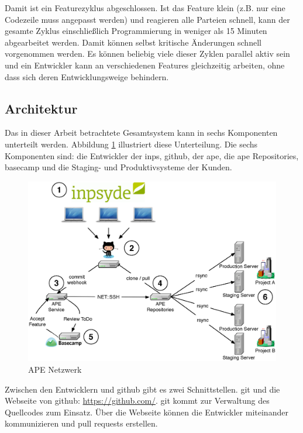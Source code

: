 Damit ist ein Featurezyklus abgeschlossen. Ist das Feature klein (z.B. nur eine Codezeile muss angepasst werden) und reagieren alle Parteien schnell, kann der gesamte Zyklus einschließlich Programmierung in weniger als 15 Minuten abgearbeitet werden. Damit können selbst kritische Änderungen schnell vorgenommen werden. Es können beliebig viele dieser Zyklen parallel aktiv sein und ein Entwickler kann an verschiedenen Features gleichzeitig arbeiten, ohne dass sich deren Entwicklungsweige behindern.


\subsection{Architektur} %
\label{sub:architektur}

Das in dieser Arbeit betrachtete Gesamtsystem kann in sechs Komponenten unterteilt werden. Abbildung \ref{fig:ape_network} illustriert diese Unterteilung. Die sechs Komponenten sind:  die Entwickler der \gls{inps},  \gls{github},  der \gls{ape},  die \gls{ape} Repositories,  \gls{basecamp} und  die Staging- und Produktivsysteme der Kunden.

\begin{figure}
	\includegraphics[width=1.0\textwidth]{assets/ape_network.eps}
	\caption{APE Netzwerk}
	\label{fig:ape_network}
\end{figure}

Zwischen den Entwicklern und \gls{github} gibt es zwei Schnittstellen. \gls{git} und die Webseite von \gls{github}: \url{https://github.com/}. \gls{git} kommt zur Verwaltung des Quellcodes zum Einsatz. Über die Webseite können die Entwickler miteinander kommunizieren und \glspl{pull request} erstellen.


